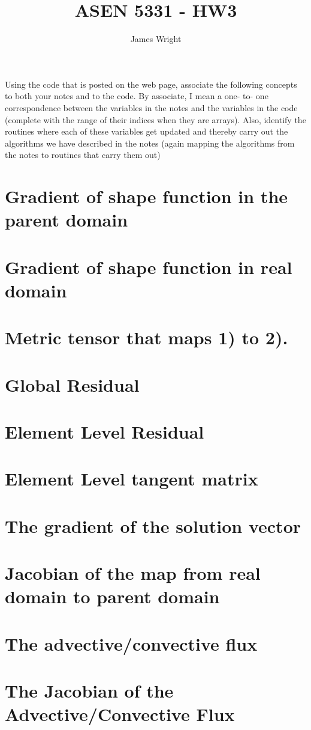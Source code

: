 \documentclass[12pt, letterpaper, twoside]{article}
\title{ASEN 5331 - HW3}
\author{James Wright}
\newcommand{\0}{\vec{0}}
\begin{document}
\maketitle

Using the code that is posted on the web page, associate the following concepts to both your notes and to the code.  By associate, I mean a one- to- one correspondence 
between the variables in the notes and the variables in the code (complete with the range of their indices when they are arrays). Also, identify the routines where each 
of these variables get updated and thereby carry out the algorithms we have described in the notes (again mapping the algorithms from the notes to routines that carry them out)


\section{Gradient of shape function in the parent domain}

\section{Gradient of shape function in real domain}

\section{Metric tensor that maps 1) to 2).}

\section{Global Residual}

\section{Element Level Residual}

\section{Element Level tangent matrix}

\section{The gradient of the solution vector}

\section{Jacobian of the map from real domain to parent domain}

\section{The advective/convective flux}

\section{The Jacobian of the Advective/Convective Flux}
\end{document}
